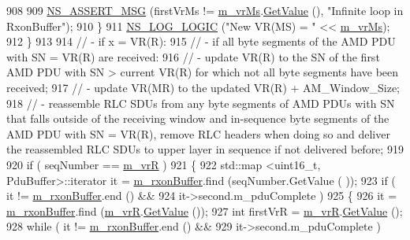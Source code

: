 \begin{DoxyCode}
908 
909               \hyperlink{assert_8h_aff5ece9066c74e681e74999856f08539}{NS\_ASSERT\_MSG} (firstVrMs != \hyperlink{classns3_1_1LteRlcAm_a474fc32f3d26bb6762782e8fd7e01c60}{m\_vrMs}.\hyperlink{classns3_1_1SequenceNumber10_a9dcaea04bc415e169e7e0020ce579d01}{GetValue} (), \textcolor{stringliteral}{"Infinite loop in
       RxonBuffer"});
910             \}
911           \hyperlink{group__logging_ga88acd260151caf2db9c0fc84997f45ce}{NS\_LOG\_LOGIC} (\textcolor{stringliteral}{"New VR(MS) = "} << \hyperlink{classns3_1_1LteRlcAm_a474fc32f3d26bb6762782e8fd7e01c60}{m\_vrMs});
912         \}
913 
914       \textcolor{comment}{// - if x = VR(R):}
915       \textcolor{comment}{//     - if all byte segments of the AMD PDU with SN = VR(R) are received:}
916       \textcolor{comment}{//         - update VR(R) to the SN of the first AMD PDU with SN > current VR(R) for which not all
       byte segments have been received;}
917       \textcolor{comment}{//         - update VR(MR) to the updated VR(R) + AM\_Window\_Size;}
918       \textcolor{comment}{//     - reassemble RLC SDUs from any byte segments of AMD PDUs with SN that falls outside of the
       receiving window and in-sequence byte segments of the AMD PDU with SN = VR(R), remove RLC headers when doing so
       and deliver the reassembled RLC SDUs to upper layer in sequence if not delivered before;}
919 
920       \textcolor{keywordflow}{if} ( seqNumber == \hyperlink{classns3_1_1LteRlcAm_aeec4bcfab747723421c68ed38feea081}{m\_vrR} )
921         \{
922           std::map <uint16\_t, PduBuffer>::iterator it = \hyperlink{classns3_1_1LteRlcAm_a7442b4f97fccd0c393dd9f27325a853a}{m\_rxonBuffer}.find (seqNumber.GetValue (
      ));
923           \textcolor{keywordflow}{if} ( it != \hyperlink{classns3_1_1LteRlcAm_a7442b4f97fccd0c393dd9f27325a853a}{m\_rxonBuffer}.end () &&
924                it->second.m\_pduComplete )
925             \{
926               it = \hyperlink{classns3_1_1LteRlcAm_a7442b4f97fccd0c393dd9f27325a853a}{m\_rxonBuffer}.find (\hyperlink{classns3_1_1LteRlcAm_aeec4bcfab747723421c68ed38feea081}{m\_vrR}.\hyperlink{classns3_1_1SequenceNumber10_a9dcaea04bc415e169e7e0020ce579d01}{GetValue} ());
927               \textcolor{keywordtype}{int} firstVrR = \hyperlink{classns3_1_1LteRlcAm_aeec4bcfab747723421c68ed38feea081}{m\_vrR}.\hyperlink{classns3_1_1SequenceNumber10_a9dcaea04bc415e169e7e0020ce579d01}{GetValue} ();
928               \textcolor{keywordflow}{while} ( it != \hyperlink{classns3_1_1LteRlcAm_a7442b4f97fccd0c393dd9f27325a853a}{m\_rxonBuffer}.end () &&
929                       it->second.m\_pduComplete )

\end{DoxyCode}
